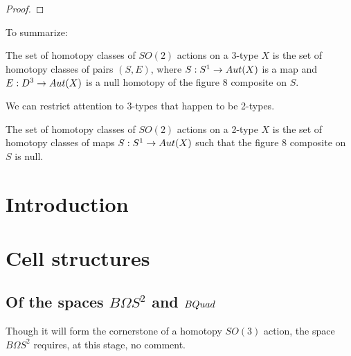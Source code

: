 \documentclass{amsart}
\begin{document}
\begin{proof}
\end{proof}

To summarize:

\begin{proposition}
The set of homotopy classes of $SO(2)$ actions on a 3-type $X$ is the set of homotopy classes of pairs $(S,E)$, where $S: S^1 \rightarrow Aut(X)$ is a map and $E : D^3 \rightarrow Aut(X)$ is a null homotopy of the figure 8 composite on $S$.
\end{proposition}


We can restrict attention to 3-types that happen to be 2-types.

\begin{corollary}
The set of homotopy classes of $SO(2)$ actions on a 2-type $X$ is the set of homotopy classes of maps $S: S^1 \rightarrow Aut(X)$ such that the figure 8 composite on $S$ is null.
\end{corollary}

\section{Introduction}

\section{Cell structures}


\subsection{Of the spaces $B\Omega S^2$ and $BQuad$}

Though it will form the cornerstone of a homotopy $SO(3)$ action, the space $B\Omega S^2$ requires, at this stage, no comment.
\end{document}
